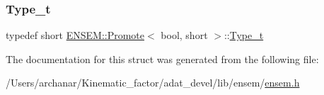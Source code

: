 \subsubsection{\texorpdfstring{Type\_t}{Type\_t}\hspace{0.1cm}{\footnotesize\ttfamily [2/2]}}
{\footnotesize\ttfamily typedef short \mbox{\hyperlink{structENSEM_1_1Promote}{E\+N\+S\+E\+M\+::\+Promote}}$<$ bool, short $>$\+::\mbox{\hyperlink{structENSEM_1_1Promote_3_01bool_00_01short_01_4_a3a13222623387509ba3bc981fe9b2d4f}{Type\+\_\+t}}}



The documentation for this struct was generated from the following file\+:\begin{DoxyCompactItemize}
\item 
/\+Users/archanar/\+Kinematic\+\_\+factor/adat\+\_\+devel/lib/ensem/\mbox{\hyperlink{lib_2ensem_2ensem_8h}{ensem.\+h}}\end{DoxyCompactItemize}

